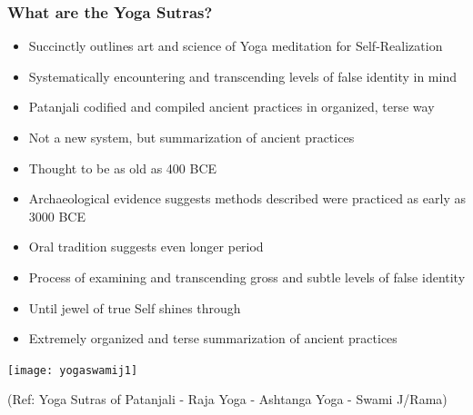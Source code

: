 \begin{frame}[fragile]\frametitle{What are the Yoga Sutras?}

\begin{itemize}
\item Succinctly outlines art and science of Yoga meditation for Self-Realization
\item Systematically encountering and transcending levels of false identity in mind
\item Patanjali codified and compiled ancient practices in organized, terse way
\item Not a new system, but summarization of ancient practices
\item Thought to be as old as 400 BCE
\item Archaeological evidence suggests methods described were practiced as early as 3000 BCE
\item Oral tradition suggests even longer period
\item Process of examining and transcending gross and subtle levels of false identity
\item Until jewel of true Self shines through
\item Extremely organized and terse summarization of ancient practices
\end{itemize}

\begin{center}
\texttt{[image: yogaswamij1]}

\end{center}

  
  \tiny{(Ref: Yoga Sutras of Patanjali - Raja Yoga - Ashtanga Yoga - Swami J/Rama)}

\end{frame}

